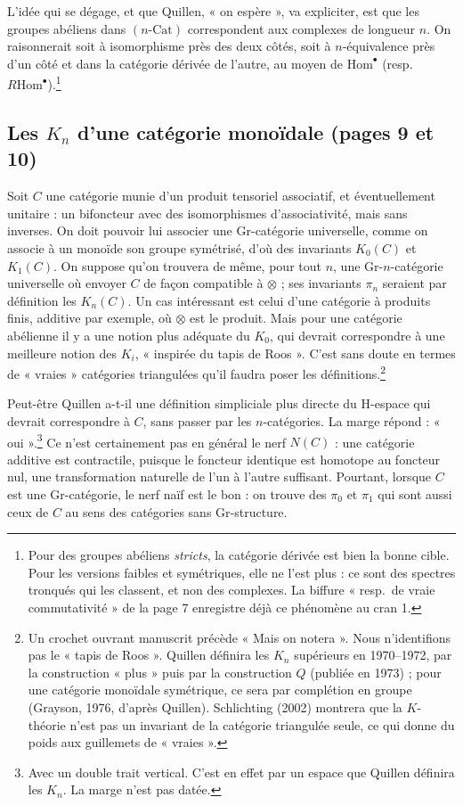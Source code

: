 \documentclass[11pt,a4paper]{article}
\begin{document}
L'idée qui se dégage, et que Quillen, « on espère », va expliciter, est que
les groupes abéliens dans $(n\text{-Cat})$ correspondent aux complexes de
longueur $n$. On raisonnerait soit à isomorphisme près des deux côtés, soit à
$n$-équivalence près d'un côté et dans la catégorie dérivée de l'autre, au
moyen de $\mathrm{Hom}^{\bullet}$ (resp.\
$R\mathrm{Hom}^{\bullet}$).\footnote{Pour des groupes abéliens
\emph{stricts}, la catégorie dérivée est bien la bonne cible. Pour les
versions faibles et symétriques, elle ne l'est plus : ce sont des spectres
tronqués qui les classent, et non des complexes. La biffure « resp.\ de vraie
commutativité » de la page 7 enregistre déjà ce phénomène au cran 1.}

\subsection*{Les $K_n$ d'une catégorie monoïdale (pages 9 et 10)}

Soit $C$ une catégorie munie d'un produit tensoriel associatif, et
éventuellement unitaire : un bifoncteur avec des isomorphismes
d'associativité, mais sans inverses. On doit pouvoir lui associer une
Gr-catégorie universelle, comme on associe à un monoïde son groupe symétrisé,
d'où des invariants $K_0(C)$ et $K_1(C)$. On suppose qu'on trouvera de même,
pour tout $n$, une Gr-$n$-catégorie universelle où envoyer $C$ de façon
compatible à $\otimes$ ; ses invariants $\pi_n$ seraient par définition les
$K_n(C)$. Un cas intéressant est celui d'une catégorie à produits finis,
additive par exemple, où $\otimes$ est le produit. Mais pour une catégorie
abélienne il y a une notion plus adéquate du $K_0$, qui devrait correspondre à
une meilleure notion des $K_i$, « inspirée du tapis de Roos ». C'est sans doute
en termes de « vraies » catégories triangulées qu'il faudra poser les
définitions.\footnote{Un crochet ouvrant manuscrit précède « Mais on
notera ». Nous n'identifions pas le « tapis de Roos ». Quillen définira les
$K_n$ supérieurs en 1970--1972, par la construction « plus » puis par la
construction $Q$ (publiée en 1973) ; pour une catégorie monoïdale symétrique,
ce sera par complétion en groupe (Grayson, 1976, d'après Quillen).
Schlichting (2002) montrera que la $K$-théorie n'est pas un invariant de la
catégorie triangulée seule, ce qui donne du poids aux guillemets de
« vraies ».}

Peut-être Quillen a-t-il une définition simpliciale plus directe du H-espace
qui devrait correspondre à $C$, sans passer par les $n$-catégories. La marge
répond : « oui ».\footnote{Avec un double trait vertical. C'est en effet par un
espace que Quillen définira les $K_n$. La marge n'est pas datée.} Ce n'est
certainement pas en général le nerf $N(C)$ : une catégorie additive est
contractile, puisque le foncteur identique est homotope au foncteur nul, une
transformation naturelle de l'un à l'autre suffisant. Pourtant, lorsque $C$
est une Gr-catégorie, le nerf naïf est le bon : on trouve des $\pi_0$ et
$\pi_1$ qui sont aussi ceux de $C$ au sens des catégories sans Gr-structure.
\end{document}
